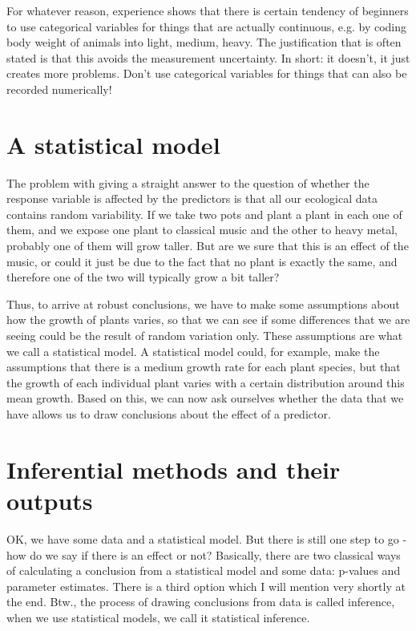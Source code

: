 \documentclass[a4paper,twoside]{tufte-book} %
\begin{document}
For whatever reason, experience shows that there is certain tendency of beginners to use categorical variables for things that are actually continuous, e.g. by coding body weight of animals into light, medium, heavy.  The justification that is often stated is that this avoids the measurement uncertainty. In short: it doesn't, it just creates more problems. Don't use categorical variables for things that can also be recorded numerically! 


\section{A statistical model}

The problem with giving a straight answer to the question of whether the response variable is affected by the predictors is that all our ecological data contains random variability. If we take two pots and plant a plant in each one of them, and we expose one plant to classical music and the other to heavy metal, probably one of them will grow taller. But are we sure that this is an effect of the music, or could it just be due to the fact that no plant is exactly the same, and therefore one of the two will typically grow a bit taller?

Thus, to arrive at robust conclusions, we have to make some assumptions about how the growth of plants varies, so that we can see if some differences that we are seeing could be the result of random variation only. These assumptions are what we call a statistical model.  A statistical model could, for example, make the assumptions that there is a medium growth rate for each plant species, but that the growth of each individual plant varies with a certain distribution around this mean growth. Based on this, we can now ask ourselves whether the data that we have allows us to draw conclusions about the effect of a predictor. 

\section{Inferential methods and their outputs}

OK, we have some data and a statistical model. But there is still one step to go - how do we say if there is an effect or not? Basically, there are two classical ways of calculating a conclusion from a statistical model and some data: p-values and parameter estimates. There is a third option which I will mention very shortly at the end.  Btw., the process of drawing conclusions from data is called inference, when we use statistical models, we call it statistical inference. 
\end{document}
